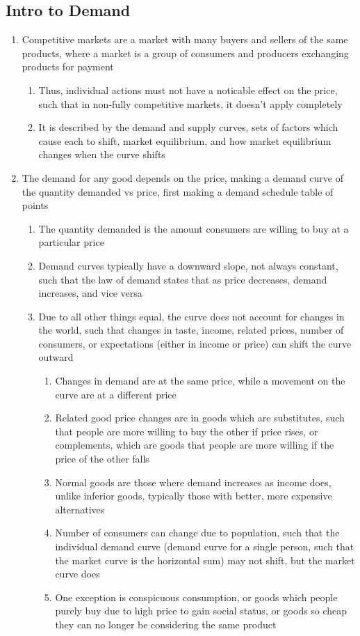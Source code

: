 \documentclass[11 pt, twoside]{article}
\begin{document}
\subsection{Intro to Demand}
\begin{enumerate}
\item Competitive markets are a market with many buyers and sellers of the same products, where a market is a group of consumers and producers exchanging products for payment
\begin{enumerate}
\item Thus, individual actions must not have a noticable effect on the price, such that in non-fully competitive markets, it doesn't apply completely
\item It is described by the demand and supply curves, sets of factors which cause each to shift, market equilibrium, and how market equilibrium changes when the curve shifts
\end{enumerate}
\item The demand for any good depends on the price, making a demand curve of the quantity demanded vs price, first making a demand schedule table of points
\begin{enumerate}
\item The quantity demanded is the amount consumers are willing to buy at a particular price
\item Demand curves typically have a downward slope, not always constant, such that the law of demand states that as price decreases, demand increases, and vice versa
\item Due to all other things equal, the curve does not account for changes in the world, such that changes in taste, income, related prices, number of consumers, or expectations (either in income or price) can shift the curve outward
\begin{enumerate}
\item Changes in demand are at the same price, while a movement on the curve are at a different price
\item Related good price changes are in goods which are substitutes, such that people are more willing to buy the other if price rises, or complements, which are goods that people are more willing if the price of the other falls
\item Normal goods are those where demand increases as income does, unlike inferior goods, typically those with better, more expensive alternatives
\item Number of consumers can change due to population, such that the individual demand curve (demand curve for a single person, such that the market curve is the horizontal sum) may not shift, but the market curve does 
\item One exception is conspicuous consumption, or goods which people purely buy due to high price to gain social status, or goods so cheap they can no longer be considering the same product
\end{enumerate}
\end{enumerate}
\end{enumerate}
\end{document}
